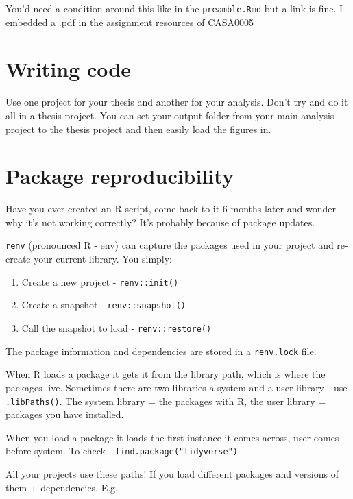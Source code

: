 \documentclass[
  12pt,
  oneside]{book}
\providecommand{\tightlist}{%
  \setlength{\itemsep}{0pt}\setlength{\parskip}{0pt}}
\begin{document}
You'd need a condition around this like in the \texttt{preamble.Rmd} but a link is fine. I embedded a .pdf in \href{https://andrewmaclachlan.github.io/CASA0005repo/assignment-resources-1.html}{the assignment resources of CASA0005}

\section{Writing code}\label{writing-code}

Use one project for your thesis and another for your analysis. Don't try and do it all in a thesis project. You can set your output folder from your main analysis project to the thesis project and then easily load the figures in.

\section{Package reproducibility}\label{package-reproducibility}

Have you ever created an R script, come back to it 6 months later and wonder why it's not working correctly? It's probably because of package updates.

\texttt{renv} (pronounced R - env) can capture the packages used in your project and re-create your current library. You simply:

\begin{enumerate}
\def\labelenumi{\arabic{enumi}.}
\tightlist
\item
  Create a new project - \texttt{renv::init()}
\item
  Create a snapshot - \texttt{renv::snapshot()}
\item
  Call the snapshot to load - \texttt{renv::restore()}
\end{enumerate}

The package information and dependencies are stored in a \texttt{renv.lock} file.

When R loads a package it gets it from the library path, which is where the packages live. Sometimes there are two libraries a system and a user library - use \texttt{.libPaths()}. The system library = the packages with R, the user library = packages you have installed.

When you load a package it loads the first instance it comes across, user comes before system. To check - \texttt{find.package("tidyverse")}

All your projects use these paths! If you load different packages and versions of them + dependencies. E.g.
\end{document}
